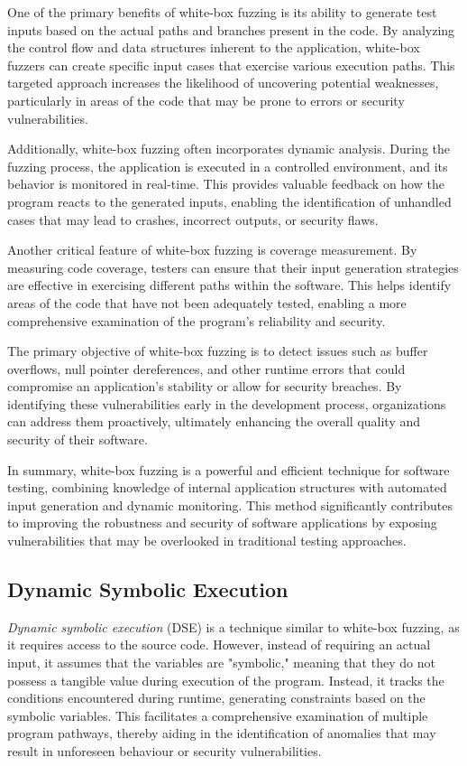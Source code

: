 One of the primary benefits of white-box fuzzing is its ability to generate test inputs based on the actual paths and branches present in the code. By analyzing the control flow and data structures inherent to the application, white-box fuzzers can create specific input cases that exercise various execution paths. This targeted approach increases the likelihood of uncovering potential weaknesses, particularly in areas of the code that may be prone to errors or security vulnerabilities.

Additionally, white-box fuzzing often incorporates dynamic analysis. During the fuzzing process, the application is executed in a controlled environment, and its behavior is monitored in real-time. This provides valuable feedback on how the program reacts to the generated inputs, enabling the identification of unhandled cases that may lead to crashes, incorrect outputs, or security flaws.

Another critical feature of white-box fuzzing is coverage measurement. By measuring code coverage, testers can ensure that their input generation strategies are effective in exercising different paths within the software. This helps identify areas of the code that have not been adequately tested, enabling a more comprehensive examination of the program's reliability and security.

The primary objective of white-box fuzzing is to detect issues such as buffer overflows, null pointer dereferences, and other runtime errors that could compromise an application’s stability or allow for security breaches. By identifying these vulnerabilities early in the development process, organizations can address them proactively, ultimately enhancing the overall quality and security of their software.

In summary, white-box fuzzing is a powerful and efficient technique for software testing, combining knowledge of internal application structures with automated input generation and dynamic monitoring. This method significantly contributes to improving the robustness and security of software applications by exposing vulnerabilities that may be overlooked in traditional testing approaches.\cite{godefroid_random_2007}




\subsection{Dynamic Symbolic Execution}
\label{sec:dse}
\textit{Dynamic symbolic execution} (DSE) is a technique similar to white-box fuzzing, as it requires access to the source code. However, instead of requiring an actual input, it assumes that the variables are "symbolic," meaning that they do not possess a tangible value during execution of the program. Instead, it tracks the conditions encountered during runtime, generating constraints based on the symbolic variables. This facilitates a comprehensive examination of multiple program pathways, thereby aiding in the identification of anomalies that may result in unforeseen behaviour or security vulnerabilities.

